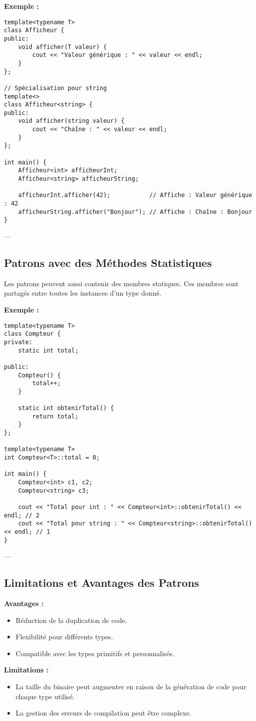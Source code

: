 \textbf{Exemple :}
\begin{tcolorbox}[colframe=blue!50!black, colback=blue!5!white, title=Exemple de Spécialisation de Patron]
\begin{verbatim}
template<typename T>
class Afficheur {
public:
    void afficher(T valeur) {
        cout << "Valeur générique : " << valeur << endl;
    }
};

// Spécialisation pour string
template<>
class Afficheur<string> {
public:
    void afficher(string valeur) {
        cout << "Chaîne : " << valeur << endl;
    }
};

int main() {
    Afficheur<int> afficheurInt;
    Afficheur<string> afficheurString;

    afficheurInt.afficher(42);           // Affiche : Valeur générique : 42
    afficheurString.afficher("Bonjour"); // Affiche : Chaîne : Bonjour
}
\end{verbatim}
\end{tcolorbox}

---

\subsection{ Patrons avec des Méthodes Statistiques}
Les patrons peuvent aussi contenir des membres statiques. Ces membres sont partagés entre toutes les instances d'un type donné.

\textbf{Exemple :}
\begin{tcolorbox}[colframe=blue!50!black, colback=blue!5!white, title=Exemple de Méthodes Statistiques]
\begin{verbatim}
template<typename T>
class Compteur {
private:
    static int total;

public:
    Compteur() {
        total++;
    }

    static int obtenirTotal() {
        return total;
    }
};

template<typename T>
int Compteur<T>::total = 0;

int main() {
    Compteur<int> c1, c2;
    Compteur<string> c3;

    cout << "Total pour int : " << Compteur<int>::obtenirTotal() << endl; // 2
    cout << "Total pour string : " << Compteur<string>::obtenirTotal() << endl; // 1
}
\end{verbatim}
\end{tcolorbox}

---

\subsection{ Limitations et Avantages des Patrons}
\textbf{Avantages :}
\begin{itemize}
    \item Réduction de la duplication de code.
    \item Flexibilité pour différents types.
    \item Compatible avec les types primitifs et personnalisés.
\end{itemize}

\textbf{Limitations :}
\begin{itemize}
    \item La taille du binaire peut augmenter en raison de la génération de code pour chaque type utilisé.
    \item La gestion des erreurs de compilation peut être complexe.
\end{itemize}
